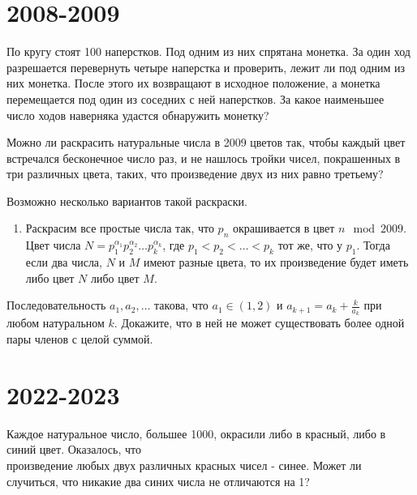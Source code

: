 \documentclass[11pt, a4paper]{problems_template}
\begin{document}
\chapter{2008-2009}

\begin{exercise}
По кругу стоят 100 наперстков. Под одним из них спрятана монетка. За один ход разрешается перевернуть четыре наперстка и проверить, лежит ли под одним из них монетка. После этого их возвращают в исходное положение, а монетка перемещается под один из соседних с ней наперстков. За какое наименьшее число ходов наверняка удастся обнаружить монетку?
\end{exercise}

\begin{exercise}
Можно ли раскрасить натуральные числа в 2009 цветов так, чтобы каждый цвет встречался бесконечное число раз, и не нашлось тройки чисел, покрашенных в три различных цвета, таких, что произведение двух из них равно третьему?
\end{exercise}

\begin{Solution}
Возможно несколько вариантов такой раскраски.
\begin{enumerate}
\item Раскрасим все простые числа так, что $p_{n}$ окрашивается в цвет $n \mod 2009$. Цвет числа $N = p_{1}^{\alpha_{1}} p_{2}^{\alpha_{2}} \dots p_{k}^{\alpha_{k}}$, где $p_{1} < p_{2} < \dots < p_{k}$ тот же, что у $p_{1}$. Тогда если два числа, $N$ и $M$ имеют разные цвета, то их произведение будет иметь либо цвет $N$ либо цвет $M$.
\end{enumerate}
\end{Solution}

\begin{exercise}
Последовательность $a_{1}, a_{2}, \dots$ такова, что $a_{1} \in (1, 2)$ и $a_{k+1} = a_{k} + \frac{k}{a_{k}}$ при любом натуральном $k$. Докажите, что в ней не может существовать более одной пары членов с целой суммой.
\end{exercise}

\chapter{2022-2023}

\begin{exercise}
Каждое натуральное число, большее 1000, окрасили либо в красный, либо в синий цвет. Оказалось, что \\ произведение любых двух различных красных чисел - синее. Может ли случиться, что никакие два синих числа не отличаются на 1?
\end{exercise}
\end{document}
